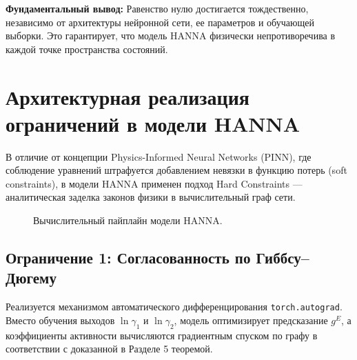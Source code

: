 \documentclass[12pt,a4paper]{article}
\begin{document}
\textbf{Фундаментальный вывод:} Равенство нулю достигается тождественно, независимо от архитектуры нейронной сети, ее параметров и обучающей выборки. Это гарантирует, что модель HANNA физически непротиворечива в каждой точке пространства состояний.


\section{Архитектурная реализация ограничений в модели HANNA}

В отличие от концепции Physics-Informed Neural Networks (PINN), где соблюдение уравнений штрафуется добавлением невязки в функцию потерь (soft constraints), в модели HANNA применен подход Hard Constraints — аналитическая заделка законов физики в вычислительный граф сети.

\begin{figure}[htbp]
\centering
{}
\caption{Вычислительный пайплайн модели HANNA.}
\end{figure}

\subsection{Ограничение 1: Согласованность по Гиббсу--Дюгему}
Реализуется механизмом автоматического дифференцирования \texttt{torch.autograd}. Вместо обучения выходов $\ln \gamma_1$ и $\ln \gamma_2$, модель оптимизирует предсказание $g^E$, а коэффициенты активности вычисляются градиентным спуском по графу в соответствии с доказанной в Разделе 5 теоремой.
\end{document}
